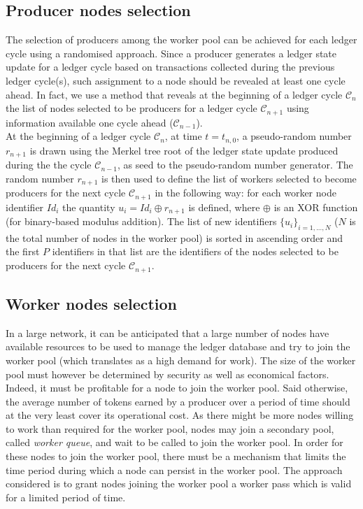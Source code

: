 \subsection{Producer nodes selection}
The selection of producers among the worker pool can be achieved for each ledger cycle using a randomised approach. Since a producer generates a ledger state update for a ledger cycle based on transactions collected during the previous ledger cycle(s), such assignment to a node should be revealed at least one cycle ahead. In fact, we use a method that reveals at the beginning of a ledger cycle $\mathcal{C}_n$ the list of nodes selected to be producers for a ledger cycle $\mathcal{C}_{n+1}$ using information available one cycle ahead ($\mathcal{C}_{n-1}$).\\

At the beginning of a ledger cycle $\mathcal{C}_n$, at time $t = t_{n,0}$, a pseudo-random number $r_{n+1}$ is drawn using the Merkel tree root of the ledger state update produced during the the cycle $\mathcal{C}_{n-1}$, as seed to the pseudo-random number generator. The random number $r_{n+1}$ is then used to define the list of workers selected to become producers for the next cycle $\mathcal{C}_{n+1}$ in the following way: for each worker node identifier $Id_i$ the quantity $u_i = Id_i \oplus r_{n+1}$ is defined, where $\oplus$ is an XOR function (for binary-based modulus addition). The list of new identifiers $\{u_i \}_{i=1,...,N}$ ($N$ is the total number of nodes in the worker pool) is sorted in ascending order and the first $P$ identifiers in that list are the identifiers of the nodes selected to be producers for the next cycle $\mathcal{C}_{n+1}$.

\subsection{Worker nodes selection}

In a large network, it can be anticipated that a large number of nodes have available resources to be used to manage the ledger database and try to join the worker pool (which translates as a high demand for work). The size of the worker pool must however be determined by security as well as economical factors. Indeed, it must be profitable for a node to join the worker pool. Said otherwise, the average number of tokens earned by a producer over a period of time should at the very least cover its operational cost. As there might be more nodes willing to work than required for the worker pool, nodes may join a secondary pool, called \textit{worker queue}, and wait to be called to join the worker pool. In order for these nodes to join the worker pool, there must be a mechanism that limits the time period during which a node can persist in the worker pool. The approach considered is to grant nodes joining the worker pool a worker pass which is valid for a limited period of time. \\

